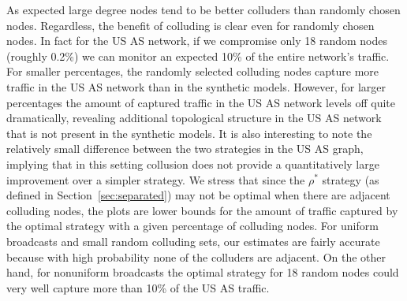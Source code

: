 \documentclass[prodmode,acmec]{ec-acmsmall}
\begin{document}
As expected large degree nodes tend to be better colluders than randomly chosen
nodes. Regardless, the benefit of colluding is clear even for randomly chosen
nodes. In fact for the US AS network, if we compromise only 18 random nodes
(roughly 0.2\%) we can monitor an expected 10\% of the entire network's
traffic. For smaller percentages, the randomly selected colluding nodes capture
more traffic in the US AS network than in the synthetic models. However, for
larger percentages the amount of captured traffic in the US AS network levels
off quite dramatically, revealing additional topological structure in the US AS
network that is not present in the synthetic models. It is also interesting to
note the relatively small difference between the two strategies in the US AS
graph, implying that in this setting collusion does not provide a
quantitatively large improvement over a simpler strategy. We stress that since
the $\rho^*$ strategy (as defined in Section~\ref{sec:separated}) may not be
optimal when there are adjacent colluding nodes, the plots are lower bounds for
the amount of traffic captured by the optimal strategy with a given percentage
of colluding nodes. For uniform broadcasts and small random colluding sets, our
estimates are fairly accurate because with high probability none of the
colluders are adjacent. On the other hand, for nonuniform broadcasts the
optimal strategy for 18 random nodes could very well capture more than 10\% of
the US AS traffic.
\end{document}
